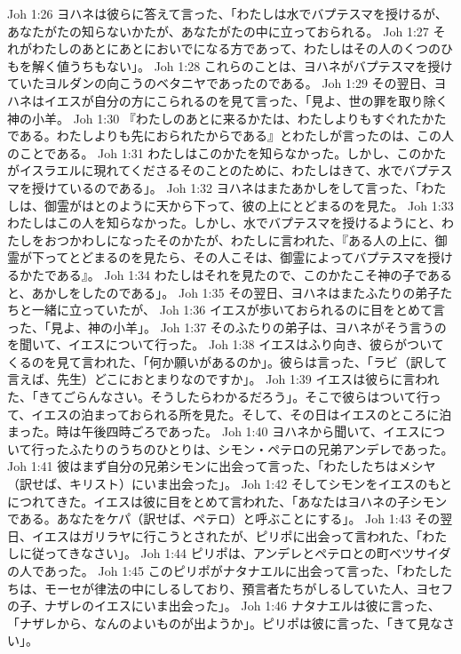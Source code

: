 Joh 1:26  ヨハネは彼らに答えて言った、「わたしは水でバプテスマを授けるが、あなたがたの知らないかたが、あなたがたの中に立っておられる。
Joh 1:27  それがわたしのあとにあとにおいでになる方であって、わたしはその人のくつのひもを解く値うちもない」。
Joh 1:28  これらのことは、ヨハネがバプテスマを授けていたヨルダンの向こうのベタニヤであったのである。
Joh 1:29  その翌日、ヨハネはイエスが自分の方にこられるのを見て言った、「見よ、世の罪を取り除く神の小羊。
Joh 1:30  『わたしのあとに来るかたは、わたしよりもすぐれたかたである。わたしよりも先におられたからである』とわたしが言ったのは、この人のことである。
Joh 1:31  わたしはこのかたを知らなかった。しかし、このかたがイスラエルに現れてくださるそのことのために、わたしはきて、水でバプテスマを授けているのである」。
Joh 1:32  ヨハネはまたあかしをして言った、「わたしは、御霊がはとのように天から下って、彼の上にとどまるのを見た。
Joh 1:33  わたしはこの人を知らなかった。しかし、水でバプテスマを授けるようにと、わたしをおつかわしになったそのかたが、わたしに言われた、『ある人の上に、御霊が下ってとどまるのを見たら、その人こそは、御霊によってバプテスマを授けるかたである』。
Joh 1:34  わたしはそれを見たので、このかたこそ神の子であると、あかしをしたのである」。
Joh 1:35  その翌日、ヨハネはまたふたりの弟子たちと一緒に立っていたが、
Joh 1:36  イエスが歩いておられるのに目をとめて言った、「見よ、神の小羊」。
Joh 1:37  そのふたりの弟子は、ヨハネがそう言うのを聞いて、イエスについて行った。
Joh 1:38  イエスはふり向き、彼らがついてくるのを見て言われた、「何か願いがあるのか」。彼らは言った、「ラビ（訳して言えば、先生）どこにおとまりなのですか」。
Joh 1:39  イエスは彼らに言われた、「きてごらんなさい。そうしたらわかるだろう」。そこで彼らはついて行って、イエスの泊まっておられる所を見た。そして、その日はイエスのところに泊まった。時は午後四時ごろであった。
Joh 1:40  ヨハネから聞いて、イエスについて行ったふたりのうちのひとりは、シモン・ペテロの兄弟アンデレであった。
Joh 1:41  彼はまず自分の兄弟シモンに出会って言った、「わたしたちはメシヤ（訳せば、キリスト）にいま出会った」。
Joh 1:42  そしてシモンをイエスのもとにつれてきた。イエスは彼に目をとめて言われた、「あなたはヨハネの子シモンである。あなたをケパ（訳せば、ペテロ）と呼ぶことにする」。
Joh 1:43  その翌日、イエスはガリラヤに行こうとされたが、ピリポに出会って言われた、「わたしに従ってきなさい」。
Joh 1:44  ピリポは、アンデレとペテロとの町ベツサイダの人であった。
Joh 1:45  このピリポがナタナエルに出会って言った、「わたしたちは、モーセが律法の中にしるしており、預言者たちがしるしていた人、ヨセフの子、ナザレのイエスにいま出会った」。
Joh 1:46  ナタナエルは彼に言った、「ナザレから、なんのよいものが出ようか」。ピリポは彼に言った、「きて見なさい」。
